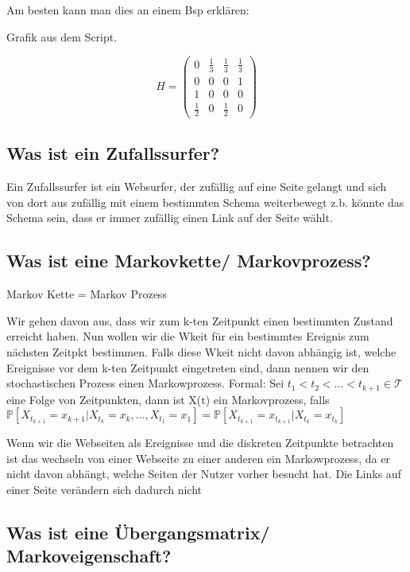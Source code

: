 \documentclass[]{article}
\begin{document}
 Am besten kann man dies an einem Bsp erklären: 

Grafik aus dem Script.

\begin{equation}
H = 
\begin{pmatrix}
0 & \frac{1}{3} & \frac{1}{3} & \frac{1}{3} \\
0 & 0 & 0 & 1\\
1 & 0 & 0 & 0 \\
\frac{1}{2} & 0 & \frac{1}{2} & 0
\end{pmatrix}
\end{equation}

\subsection*{Was ist ein Zufallssurfer? }
Ein Zufallssurfer ist ein Websurfer, der zufällig auf eine Seite gelangt und sich von dort aus zufällig mit einem bestimmten Schema weiterbewegt z.b. könnte das Schema sein, dass er immer zufällig einen Link auf der Seite wählt. 

\subsection*{Was ist eine Markovkette/ Markovprozess? }
Markov Kette = Markov Prozess

Wir gehen davon aus, dass wir zum k-ten Zeitpunkt einen bestimmten Zustand erreicht haben. Nun wollen wir die Wkeit für ein bestimmtes Ereignis zum nächsten Zeitpkt bestimmen. Falls diese Wkeit nicht davon abhängig ist, welche Ereignisse vor dem k-ten Zeitpunkt eingetreten sind, dann nennen wir den stochastischen Prozess einen Markowprozess.
Formal: 
Sei $t_1 < t_2 < \dots < t_{k+1} \in \mathcal{T}$ eine Folge von Zeitpunkten, dann ist X(t) ein Markovprozess, falls
$ \mathbb{P}[X_{t_{k+1}} = x_{k+1} | X_{t_k} = x_{k}, \dots , X_{t_1} = x_{1} ] = \mathbb{P} [X_{t_{k+1}} = x_{t_{k+1}} | X_{t_k} = x_{t_k} ] $

Wenn wir die Webseiten als Ereignisse und die diskreten Zeitpunkte betrachten ist das wechseln von einer Webseite zu einer anderen ein Markowprozess, da er nicht davon abhängt, welche Seiten der Nutzer vorher besucht hat. Die Links auf einer Seite verändern sich dadurch nicht

\subsection*{Was ist eine Übergangsmatrix/ Markoveigenschaft?}
\end{document}
